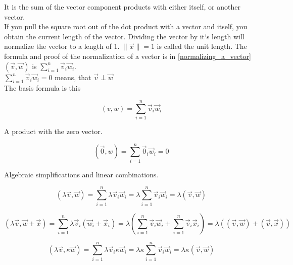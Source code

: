 \documentclass[a4paper]{article}
\begin{document}
It is the sum of the vector component products with either itself, or another vector.\\

If you pull the square root out of the dot product with a vector and itself, you obtain the current length of the vector.
Dividing the vector by it`s length will normalize the vector to a length of $1$. $\|\vec{x}\| = 1$ is called the unit length.
The formula and proof of the normalization of a vector is in \ref{normalizing_a_vector}\\

$(\vec{v}, \vec{w})$ is $\sum_{i=1}^{n}\vec{v}_{i}\vec{w}_{i}$.  \\

$\sum_{i=1}^{n}\vec{v}_{i}\vec{w}_{i} = 0$ means, that $\vec{v} \perp \vec{w}$ \\

The basis formula is this

\begin{displaymath}
    (v,w) = \sum_{i=1}^{n}\vec{v}_{i}\vec{w}_{i}
\end{displaymath}

A product with the zero vector.

\begin{displaymath}
    (\vec{0},w) = \sum_{i=1}^{n}\vec{0}_{i}\vec{w}_{i} = 0
\end{displaymath}

Algebraic simplifications and linear combinations.

\begin{displaymath}
    (\lambda\vec{v},\vec{w}) = \sum_{i=1}^{n}\lambda\vec{v}_{i}\vec{w}_{i}
    = \lambda\sum_{i=1}^{n}\vec{v}_{i}\vec{w}_{i} = \lambda(\vec{v}, \vec{w})
\end{displaymath}

\begin{displaymath}
    (\lambda\vec{v},\vec{w}+\vec{x}) = \sum_{i=1}^{n}\lambda\vec{v}_{i}(\vec{w}_{i}+\vec{x}_{i})
    = \lambda(\sum_{i=1}^{n}\vec{v}_{i}\vec{w}_{i}+\sum_{i=1}^{n}\vec{v}_{i}\vec{x}_{i})
    = \lambda((\vec{v},\vec{w})+(\vec{v},\vec{x}))
\end{displaymath}

\begin{displaymath}
    (\lambda\vec{v},\kappa\vec{w}) = \sum_{i=1}^{n}\lambda\vec{v}_{i}\kappa\vec{w}_{i}
    = \lambda\kappa\sum_{i=1}^{n}\vec{v}_{i}\vec{w}_{i} = \lambda\kappa(\vec{v}, \vec{w})
\end{displaymath}
\end{document}
